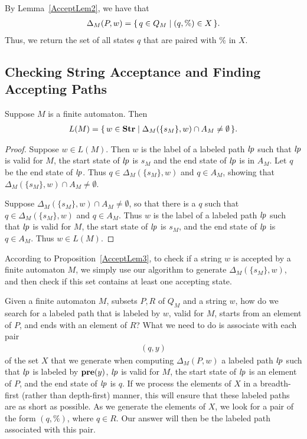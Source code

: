By Lemma~\ref{AcceptLem2}, we have that
\begin{gather*}
\Delta_M(P,w)=\{ \, q\in Q_M \mid (q,\%)\in X \, \} .
\end{gather*}
Thus, we return the set of all states $q$ that are paired with $\%$ in
$X$.

\subsection{Checking String Acceptance and Finding Accepting Paths}

\begin{proposition}
\label{AcceptLem3}
Suppose $M$ is a finite automaton.  Then
\begin{gather*}
L(M) = \setof{w\in\Str}{\Delta_M(\{s_M\}, w)
\index{L(.)@$L(\cdot)$}%
\index{finite automaton!L(.)@$L(\cdot)$}%
\index{finite automaton!L characterizing@$L(\cdot)$!characterizing}%
\mathbin{\cap}A_M\mathrel{\neq}\emptyset} .
\end{gather*}
\end{proposition}

\begin{proof}
Suppose $w\in L(M)$.  Then $w$ is the label of a labeled path ${\it lp}$
such that ${\it lp}$ is valid for $M$, the start state of ${\it lp}$ is $s_M$ and
the end state of ${\it lp}$ is in $A_M$.  Let $q$ be the end state of
${\it lp}$.  Thus $q\in\Delta_M(\{s_M\}, w)$ and $q\in A_M$, showing that
$\Delta_M(\{s_M\}, w)\cap A_M\neq\emptyset$.

Suppose $\Delta_M(\{s_M\}, w)\cap A_M\neq\emptyset$, so that
there is a $q$ such that $q\in\Delta_M(\{s_M\}, w)$ and
$q\in A_M$.  Thus $w$ is the label of a labeled path ${\it lp}$ such that
${\it lp}$ is valid for $M$, the start state of ${\it lp}$ is $s_M$,
and the end state of ${\it lp}$ is $q\in A_M$.  Thus $w\in L(M)$.
\end{proof}

According to Proposition~\ref{AcceptLem3}, to check if a string $w$ is
accepted by a finite automaton $M$, we simply 
use our algorithm to generate $\Delta_M(\{s_M\}, w)$,
and then check if this set contains at least one accepting state.

Given a finite automaton $M$, subsets $P,R$ of $Q_M$ and a string $w$,
%
how do we search for a labeled path that is labeled by $w$, valid
for $M$, starts from an element of $P$, and ends with an element of $R$?
What we need to do is associate with each pair
\begin{gather*}
(q,y)
\end{gather*}
of the set $X$ that we generate when computing $\Delta_M(P,w)$ a
labeled path ${\it lp}$ such that ${\it lp}$ is labeled by $\mathbf{pre}(y)$, ${\it lp}$ is
valid for $M$, the start state of ${\it lp}$ is an element of $P$, and the
end state of ${\it lp}$ is $q$.  If we process the elements of $X$ in a
breadth-first (rather than depth-first) manner, this will ensure that
these labeled paths are as short as possible.  As we generate the
elements of $X$, we look for a pair of the form $(q,\%)$, where $q\in
R$.  Our answer will then be the labeled path associated with this
pair.

